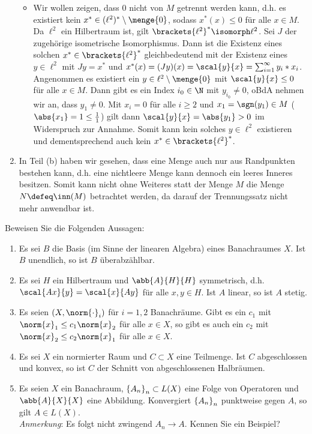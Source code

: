 \begin{exercisePage}
\begin{enumerate}[label=(zu \alph*), leftmargin=*]
\begin{itemize}[leftmargin=*]
			\item Wir wollen zeigen, dass $0$ nicht von $M$ getrennt werden kann, d.h. es existiert kein $x^\ast \in (\ell^2)^\ast \setminus \menge{0}$, sodass $x^\ast(x) \le 0$ für alle $x \in M$. Da $\ell^2$ ein Hilbertraum ist, gilt $\brackets{\ell^2}^\ast \isomorph \ell^2$. Sei $J$ der zugehörige isometrische Isomorphismus. Dann ist die Existenz eines solchen $x^\ast \in \brackets{\ell^2}^\ast$ gleichbedeutend mit der Existenz eines $y \in \ell^2$ mit $Jy = x^\ast$ und $x^\ast(x) = (Jy)(x) = \scal{y}{x} = \sum_{i=1}^\infty y_i*x_i$. Angenommen es existiert ein $y \in \ell^2 \setminus \menge{0}$ mit $\scal{y}{x} \le 0$ für alle $x \in M$. Dann gibt es ein Index $i_0 \in \N$ mit $y_{i_0} \neq 0$, oBdA nehmen wir an, dass $y_1 \neq 0$. Mit $x_i = 0$ für alle $i \ge 2$ und $x_1 = \sgn(y_1) \in M$ ($\abs{x_1} = 1 \le \frac{1}{1}$) gilt dann $\scal{y}{x} = \abs{y_1} > 0$ im Widerspruch zur Annahme. Somit kann kein solches $y \in \ell^2$ existieren und dementsprechend auch kein $x^\ast \in \brackets{\ell^2}^\ast$. 
		\end{itemize}
		\item In Teil (b) haben wir gesehen, dass eine Menge auch nur aus Randpunkten bestehen kann, d.h. eine nichtleere Menge kann dennoch ein leeres Inneres besitzen. Somit kann nicht ohne Weiteres statt der Menge $M$ die Menge $N \defeq \inn(M)$ betrachtet werden, da darauf der Trennungssatz nicht mehr anwendbar ist.
	\end{enumerate}

 	\begin{exercise}
 		Beweisen Sie die Folgenden Aussagen:
 		\begin{enumerate}
 			\item Es sei $B$ die Basis (im Sinne der linearen Algebra) eines Banachraumes $X$. Ist $B$ unendlich, so ist $B$ überabzählbar.
 			\item Es sei $H$ ein Hilbertraum und $\abb{A}{H}{H}$ symmetrisch, d.h. $\scal{Ax}{y} = \scal{x}{Ay}$ für alle $x,y \in H$. Ist $A$ linear, so ist $A$ stetig.
 			\item Es seien $(X, \norm{\cdot}_i)$ für $i = 1,2$ Banachräume. Gibt es ein $c_1$ mit $\norm{x}_1 \le c_1 \norm{x}_2$ für alle $x \in X$, so gibt es auch ein $c_2$ mit $\norm{x}_2 \le c_2 \norm{x}_1$ für alle $x \in X$.
 			\item Es sei $X$ ein normierter Raum und $C \subset X$ eine Teilmenge. Ist $C$ abgeschlossen und konvex, so ist $C$ der Schnitt von abgeschlossenen Halbräumen.
 			\item Es seien $X$ ein Banachraum, $\left\{ A_n \right\}_{n} \subset L(X)$ eine Folge von Operatoren und $\abb{A}{X}{X}$ eine Abbildung. Konvergiert $\left\{ A_n \right\}_{n}$ punktweise gegen $A$, so gilt $A \in L(X)$. \\
 			\textit{Anmerkung}: Es folgt nicht zwingend $A_n \to A$. Kennen Sie ein Beispiel? 
 		\end{enumerate}
 	\end{exercise}
 

\end{exercisePage}
